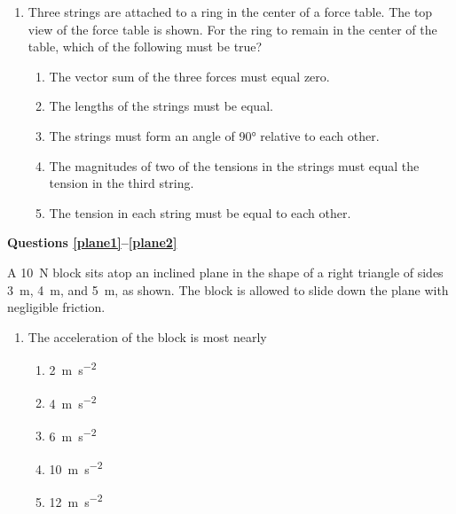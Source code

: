 \documentclass{../../../oss-apphys}
\begin{document}
\begin{multicols}{2}
\begin{enumerate}[resume,leftmargin=18pt]
  \item Three strings are attached to a ring in the center of a force table. The
    top view of the force table is shown. For the ring to remain in the
    center of the table, which of the following must be true?
    
    \begin{enumerate}[nosep,leftmargin=18pt,label=(\Alph*)]
    \item The vector sum of the three forces must equal zero.
    \item The lengths of the strings must be equal.
    \item The strings must form an angle of \ang{90} relative to each other.
    \item The magnitudes of two of the tensions in the strings must equal the
      tension in the third string.
    \item The tension in each string must be equal to each other.
    \end{enumerate}  
  \end{enumerate}
  
  \textbf{Questions \ref{plane1}--\ref{plane2}}

  A \SI{10}{\newton} block sits atop an inclined plane in the shape of a
  right triangle of sides \SI{3}{\metre}, \SI{4}{\metre}, and \SI{5}{\metre},
  as shown. The block is allowed to slide down the plane with negligible
  friction.
  \begin{center}
  \end{center}
  \begin{enumerate}[resume,leftmargin=18pt]
  \item The acceleration of the block is most nearly
    \begin{enumerate}[nosep,leftmargin=18pt,label=(\Alph*)]
    \item\SI{2}{\metre\per\second\squared}
    \item\SI{4}{\metre\per\second\squared}
    \item\SI{6}{\metre\per\second\squared}
    \item\SI{10}{\metre\per\second\squared}
    \item\SI{12}{\metre\per\second\squared}
    \end{enumerate}
    \label{plane1}
    

\end{enumerate}
\end{multicols}
\end{document}
